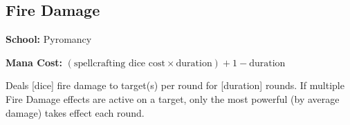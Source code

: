 \subsection{Fire Damage}

\noindent
\textbf{School:} Pyromancy

\noindent
\textbf{Mana Cost:} $(\text{spellcrafting dice cost} \times \text{duration}) + 1 - \text{duration}$

Deals [dice] fire damage to target(s) per round for [duration] rounds. If
multiple Fire Damage effects are active on a target, only the most powerful (by
average damage) takes effect each round.
